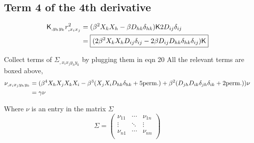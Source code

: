 \subsection{Term 4 of the 4th derivative} 
\begin{align*}
\mathsf{K}_{,y_h y_k} r^2_{,x_i x_j}
&= (\beta^2 X_k X_h - \beta D_{hk}\delta_{hk})\mathsf{K} 2 D_{ij} \delta_{ij}\\ 
&= \boxed{(2\beta^2 X_k X_h D_{ij} \delta_{ij} - 2\beta D_{ij} D_{hk} \delta_{hk}
\delta_{ij})\mathsf{K} } 
\end{align*}

Collect terms of $\Sigma_{,x_i x_j y_h y_k}$ by plugging them in eqn 20 
All the relevant terms are boxed above, 
\begin{align}
\nu_{,x_i x_j y_h y_k} &= (\beta^4 X_h X_j X_k X_i -  
\beta^3 (X_j X_i D_{hk} \delta_{hk} + 5 {\rm perm.}) + \beta^2
(D_{jh} D_{ik}\delta_{jh}\delta_{ik} + 2 {\rm perm.})) \nu \\
&= \gamma \nu
\end{align}

Where $\nu$ is an entry in the matrix $\Sigma$
\begin{equation}
\Sigma  = 
\left(
\begin{array}{ccc}
\nu_{11} & \cdots & \nu_{1n} \\
\vdots & \ddots & \vdots \\
\nu_{n1} & \cdots & \nu_{nn} \\
\end{array}
\right)
\end{equation}


